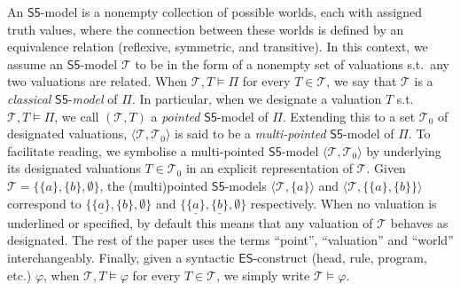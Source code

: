 \documentclass[submission,copyright,creativecommons]{eptcs}
\renewcommand{\phi}  { \varphi }
\newcommand{\tuple}[1]  { \langle #1 \rangle }
\newcommand{\doublequotes}[1]  {``#1''}
\newcommand{\set}[1]  { \{ #1 \} }
\newcommand{\logic}[1]  { \ensuremath{\mathsf{#1}} }
\newcommand{\sfive}  { \logic{S5} }
\newcommand{\ES}  { \logic{ES} }
\newcommand{\epispec}  { \Pi }
\begin{document}
An $\sfive$-model is a nonempty collection of possible worlds, each with assigned truth values, where the connection between these worlds is defined by an equivalence relation (reflexive, symmetric, and transitive).
In this context, we assume an $\sfive$-model $\mathcal T$ 
to be in the form of a nonempty set of valuations s.t.\ 
any two valuations are related.
When $\mathcal T, T \models \epispec$
for every $T \in \mathcal T$,
we say that $\mathcal T$ is a \emph{classical} $\sfive$-\emph{model} 
of $\epispec$. 
In particular, when we designate a valuation $T$ s.t.\ $\mathcal T, T \models \epispec$, we call $(\mathcal T, T)$ a \emph{pointed} $\sfive$-model
of $\epispec$. Extending this to a set $\mathcal T_0$ of designated valuations,
$\tuple{\mathcal T, \mathcal T_0}$ is said to be a \emph{multi-pointed} $\sfive$-model of $\epispec$. 
To facilitate reading, we symbolise a multi-pointed 
$\sfive$-model $\tuple{\mathcal T, \mathcal T_0}$ 
by underlying its designated valuations $T \in \mathcal T_0$ 
in an explicit representation of $\mathcal T$.
Given $\mathcal T= \set{\set a, \set b , \emptyset}$, the (multi)pointed $\sfive$-models
$\tuple{\mathcal T, \set a}$ and $\tuple{\mathcal T, \set{\set a,\set b}}$ correspond to
$\set{\underline{\set a}, \set b, \emptyset}$ and
$\set{\underline{\set a}, \underline{\set b}, \emptyset}$ respectively. 
When no valuation is underlined or specified, by default this means that any valuation of $\mathcal T$ behaves as designated. 
The rest of the paper uses the terms \doublequotes{point}, \doublequotes{valuation} and 
\doublequotes{world} interchangeably. Finally,
given a syntactic $\ES$-construct (head, rule, program, etc.) 
$\phi$, when $\mathcal T, T \models \phi$ for every $T \in \mathcal T$, we simply
write $\mathcal T \models \phi$. 

\end{document}
